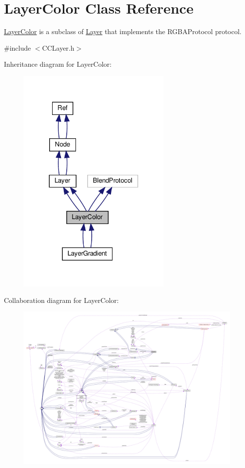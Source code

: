 \hypertarget{classLayerColor}{}\section{Layer\+Color Class Reference}
\label{classLayerColor}


\hyperlink{classLayerColor}{Layer\+Color} is a subclass of \hyperlink{classLayer}{Layer} that implements the R\+G\+B\+A\+Protocol protocol.  




{\ttfamily \#include $<$C\+C\+Layer.\+h$>$}



Inheritance diagram for Layer\+Color\+:
\nopagebreak
\begin{figure}[H]
\begin{center}
\leavevmode
\includegraphics[width=216pt]{classLayerColor__inherit__graph}
\end{center}
\end{figure}


Collaboration diagram for Layer\+Color\+:
\nopagebreak
\begin{figure}[H]
\begin{center}
\leavevmode
\includegraphics[width=350pt]{classLayerColor__coll__graph}
\end{center}
\end{figure}
